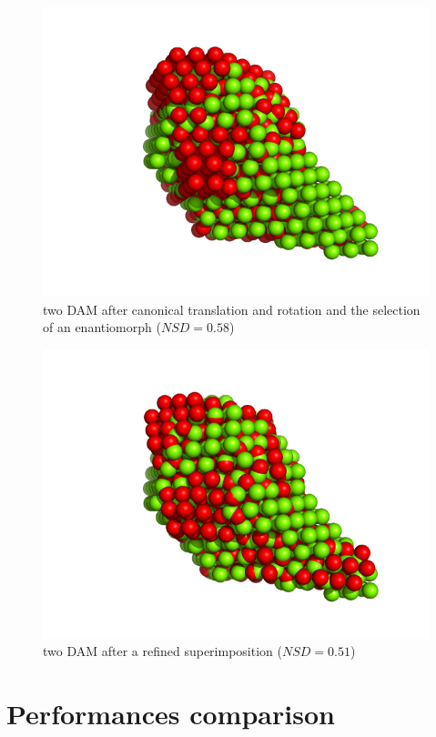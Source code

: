 \documentclass[a4paper, 11pt]{report}
\begin{document}
\begin{figure}
\centering
\includegraphics[scale=0.45]{symmetry.png}
\caption{two DAM after canonical translation and rotation and the 
  selection of an enantiomorph ($NSD = 0.58$)}
\label{fgr:symmetry}
\end{figure}

\begin{figure}
\centering
\includegraphics[scale=0.45]{superimposed.png}
\caption{two DAM after a refined superimposition ($NSD = 0.51$)}
\label{fgr:refined}
\end{figure}

\chapter{Performances comparison}
\label{perfappendix}
\end{document}
